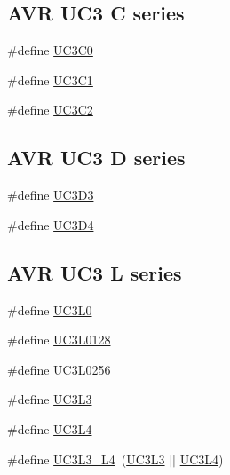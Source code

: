 \subsection*{A\-V\-R U\-C3 C series}
\begin{DoxyCompactItemize}
\item 
\#define \hyperlink{group__uc3__part__macros__group_ga4519bacce7868e73227b94af6e2a1b7f}{U\-C3\-C0}
\item 
\#define \hyperlink{group__uc3__part__macros__group_ga775cb0ff401f59a6062a4513ce6a65e6}{U\-C3\-C1}
\item 
\#define \hyperlink{group__uc3__part__macros__group_ga74bddd178c8022709acca0ad80ff4db8}{U\-C3\-C2}
\end{DoxyCompactItemize}
\subsection*{A\-V\-R U\-C3 D series}
\begin{DoxyCompactItemize}
\item 
\#define \hyperlink{group__uc3__part__macros__group_ga432af70c4d53fc917770e4ce48440613}{U\-C3\-D3}
\item 
\#define \hyperlink{group__uc3__part__macros__group_gae271cf5f4b9459baea7216c071e02d76}{U\-C3\-D4}
\end{DoxyCompactItemize}
\subsection*{A\-V\-R U\-C3 L series}
\begin{DoxyCompactItemize}
\item 
\#define \hyperlink{group__uc3__part__macros__group_ga4a399e061cd2bf1088c01a22f69cf6c1}{U\-C3\-L0}
\item 
\#define \hyperlink{group__uc3__part__macros__group_ga2acf2e6f59e322e343123ad12fe89c2c}{U\-C3\-L0128}
\item 
\#define \hyperlink{group__uc3__part__macros__group_gaa8ab88d4e48e7936416c4475b42e5b49}{U\-C3\-L0256}
\item 
\#define \hyperlink{group__uc3__part__macros__group_gade3b8d2d26305ef47bb7b52212807e1d}{U\-C3\-L3}
\item 
\#define \hyperlink{group__uc3__part__macros__group_gae119ee2bcbfe63aa6cb0bc92245943f6}{U\-C3\-L4}
\item 
\#define \hyperlink{group__uc3__part__macros__group_gae4dccd708991a86a5e8598b0c72d6bbd}{U\-C3\-L3\-\_\-\-L4}~(\hyperlink{group__uc3__part__macros__group_gade3b8d2d26305ef47bb7b52212807e1d}{U\-C3\-L3} $|$$|$ \hyperlink{group__uc3__part__macros__group_gae119ee2bcbfe63aa6cb0bc92245943f6}{U\-C3\-L4})
\end{DoxyCompactItemize}
